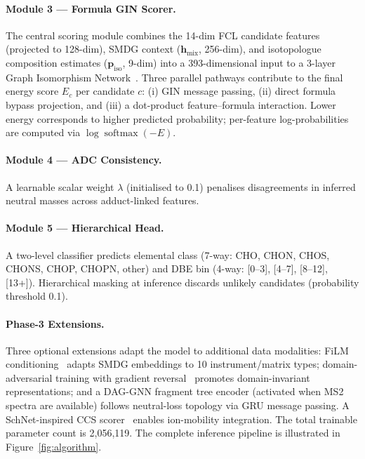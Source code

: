 \documentclass[journal=jcisd8]{achemso}
\DeclareMathOperator{\softmax}{softmax}
\newcommand{\vect}[1]{\boldsymbol{#1}}
\begin{document}
\paragraph{Module 3 --- Formula GIN Scorer.}
The central scoring module combines the 14-dim FCL candidate features
(projected to 128-dim), SMDG context ($\vect{h}_\text{mix}$, 256-dim), and
isotopologue composition estimates ($\vect{p}_\text{iso}$, 9-dim)
into a 393-dimensional input to a 3-layer Graph Isomorphism Network~\cite{Xu2019}.
Three parallel pathways contribute to the final energy score $E_c$ per candidate $c$:
(i) GIN message passing, (ii) direct formula bypass projection, and
(iii) a dot-product feature--formula interaction.  Lower energy corresponds to
higher predicted probability; per-feature log-probabilities are computed via
$\log\softmax(-E)$.

\paragraph{Module 4 --- ADC Consistency.}
A learnable scalar weight $\lambda$ (initialised to 0.1) penalises disagreements
in inferred neutral masses across adduct-linked features.

\paragraph{Module 5 --- Hierarchical Head.}
A two-level classifier predicts elemental class (7-way: CHO, CHON, CHOS, CHONS,
CHOP, CHOPN, other) and DBE bin (4-way: [0--3], [4--7], [8--12], [13+]).
Hierarchical masking at inference discards unlikely candidates (probability threshold 0.1).

\paragraph{Phase-3 Extensions.}
Three optional extensions adapt the model to additional data modalities:
FiLM conditioning~\cite{Perez2018} adapts SMDG embeddings to 10 instrument/matrix types;
domain-adversarial training with gradient reversal~\cite{Ganin2016} promotes
domain-invariant representations; and a DAG-GNN fragment tree encoder (activated when
MS2 spectra are available) follows neutral-loss topology via GRU message passing.
A SchNet-inspired CCS scorer~\cite{Schütt2018} enables ion-mobility integration.
The total trainable parameter count is 2,056,119.
The complete inference pipeline is illustrated in Figure~\ref{fig:algorithm}.
\end{document}
